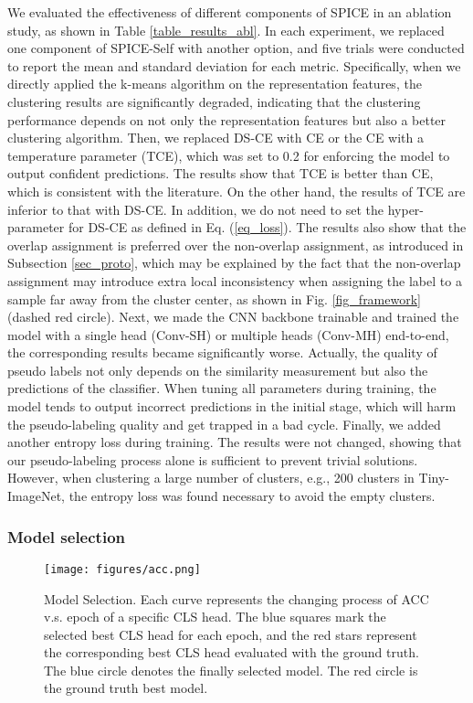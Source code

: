 \documentclass[10pt,twocolumn,letterpaper]{article}
\begin{document}
We evaluated the effectiveness of different components of SPICE in an ablation study, as shown in Table \ref{table_results_abl}. In each experiment, we replaced one component of SPICE-Self with another option, and five trials were conducted to report the mean and standard deviation for each metric. Specifically, when we directly applied the k-means algorithm on the representation features, the clustering results are significantly degraded, indicating that the clustering performance depends on not only the representation features but also a better clustering algorithm. Then, we replaced DS-CE with CE or the CE with a temperature parameter (TCE), which was set to 0.2 for enforcing the model to output confident predictions. The results show that TCE is better than CE, which is consistent with the literature. On the other hand, the results of TCE are inferior to that with  DS-CE. In addition, we do not need to set the hyper-parameter for DS-CE as defined in Eq. (\ref{eq_loss}). The results also show that the overlap assignment is preferred over the non-overlap assignment, as introduced in Subsection \ref{sec_proto}, which may be explained by the fact that the non-overlap assignment may introduce extra local inconsistency when assigning the label to a sample far away from the cluster center, as shown in Fig. \ref{fig_framework} (dashed red circle).
Next, we made the CNN backbone trainable and trained the model with a single head (Conv-SH) or multiple heads (Conv-MH) end-to-end, the corresponding results became significantly worse. Actually, the quality of pseudo labels not only depends on the similarity measurement but also the predictions of the classifier. When tuning all parameters during training, the model tends to output incorrect predictions in the initial stage, which will harm the pseudo-labeling quality and get trapped in a bad cycle.
Finally, we added another entropy loss during training. The results were not changed, showing that our pseudo-labeling process alone is sufficient to prevent trivial solutions. However, when clustering a large number of clusters, e.g., 200 clusters in Tiny-ImageNet, the entropy loss was found necessary to avoid the empty clusters.

\subsubsection{Model selection}

\begin{figure}[bt!]
    \centering
    \texttt{[image: figures/acc.png]}
    \caption{Model Selection. Each curve represents the changing process of ACC v.s. epoch of a specific CLS head. The blue squares mark the selected best CLS head for each epoch, and the red stars represent the corresponding best CLS head evaluated with the ground truth. The blue circle denotes the finally selected model. The red circle is the ground truth best model.}
    \label{fig_select}
\end{figure}
\end{document}

